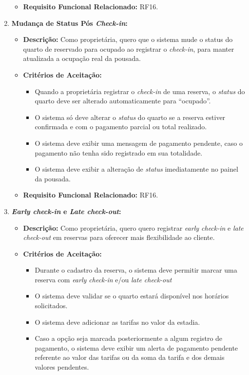 \documentclass[
	12pt,				%
	openany,			%
	oneside,			%
	a4paper,			%
	english,			%
	french,				%
	spanish,			%
	brazil				%
	]{abntex2}
\begin{document}
\begin{enumerate}[label=\textbf{\arabic*.}]
\begin{itemize}
		\item \textbf{Requisito Funcional Relacionado:} RF16.
	\end{itemize} 
	\item \textbf{Mudança de Status Pós \textit{Check-in}:}
	\begin{itemize}
		\item \textbf{Descrição:} Como proprietária, quero que o sistema mude o status do quarto de reservado para ocupado ao registrar o \textit{check-in}, para manter atualizada a ocupação real da pousada.
		\item \textbf{Critérios de Aceitação:}
		\begin{itemize}
			\item Quando a proprietária registrar o \textit{check-in} de uma reserva, o \textit{status} do quarto deve ser alterado automaticamente para “ocupado”.
			\item O sistema só deve alterar o \textit{status} do quarto se a reserva estiver confirmada e com o pagamento parcial ou total realizado.
			\item O sistema deve exibir uma mensagem de pagamento pendente, caso o pagamento não tenha sido registrado em sua totalidade.
			\item O sistema deve exibir a alteração de \textit{status} imediatamente no painel da pousada.
		\end{itemize}
		\item \textbf{Requisito Funcional Relacionado:} RF16.
	\end{itemize} 
	\item \textbf{\textit{Early check-in} e \textit{Late check-out}:}
	\begin{itemize}
		\item \textbf{Descrição:}  Como proprietária, quero quero registrar \textit{early check-in} e \textit{late check-out} em reservas para oferecer mais flexibilidade ao cliente.
		\item \textbf{Critérios de Aceitação:}
		\begin{itemize}
			\item Durante o cadastro da reserva, o sistema deve permitir marcar uma reserva com \textit{early check-in} e/ou \textit{late check-out}
			\item O sistema deve validar se o quarto estará disponível nos horários solicitados.
			\item O sistema deve adicionar as tarifas no valor da estadia.
			\item Caso a opção seja marcada posteriormente a algum registro de pagamento, o sistema deve exibir um alerta de pagamento pendente referente ao valor das tarifas ou da soma da tarifa e dos demais valores pendentes.

\end{itemize}
\end{itemize}
\end{enumerate}
\end{document}

